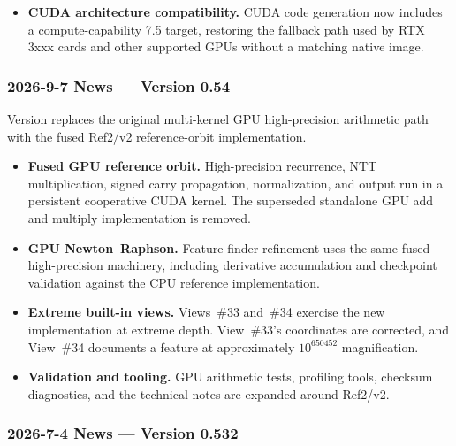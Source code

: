 \begin{itemize}
\item \textbf{CUDA architecture compatibility.} CUDA code generation now
  includes a compute-capability 7.5 target, restoring the fallback path used by
  RTX 3xxx cards and other supported GPUs without a matching native image.
\end{itemize}

\subsubsection{2026-9-7 News --- Version 0.54}

Version  replaces the original multi-kernel GPU high-precision
arithmetic path with the fused Ref2/v2 reference-orbit implementation.

\begin{itemize}
\item \textbf{Fused GPU reference orbit.} High-precision recurrence, NTT
  multiplication, signed carry propagation, normalization, and output run in a
  persistent cooperative CUDA kernel. The superseded standalone GPU add and
  multiply implementation is removed.

\item \textbf{GPU Newton--Raphson.} Feature-finder refinement uses the same
  fused high-precision machinery, including derivative accumulation and
  checkpoint validation against the CPU reference implementation.

\item \textbf{Extreme built-in views.} Views~\#33 and~\#34 exercise the new
  implementation at extreme depth. View~\#33's coordinates are corrected, and
  View~\#34 documents a feature at approximately $10^{650452}$ magnification.

\item \textbf{Validation and tooling.} GPU arithmetic tests, profiling tools,
  checksum diagnostics, and the technical notes are expanded around Ref2/v2.
\end{itemize}

\subsubsection{2026-7-4 News --- Version 0.532}

